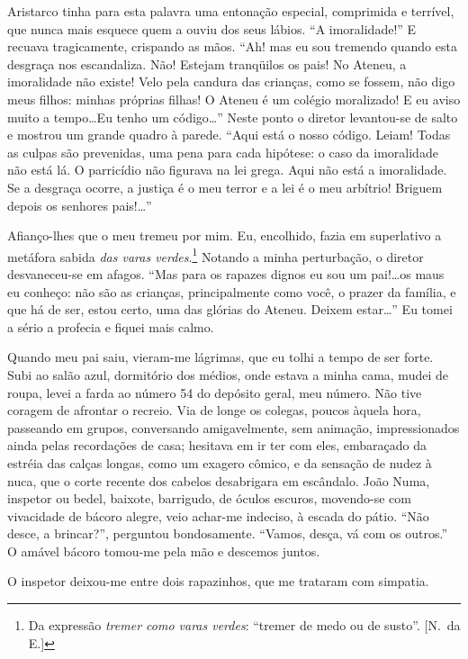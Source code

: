 Aristarco tinha para esta palavra uma
entonação especial, comprimida e terrível, que nunca mais esquece quem
a ouviu dos seus lábios. ``A imoralidade!'' E recuava tragicamente,
crispando as mãos. ``Ah! mas eu sou tremendo quando esta desgraça nos
escandaliza. Não! Estejam tranqüilos os pais! No Ateneu, a imoralidade
não existe! Velo pela candura das crianças, como se fossem, não digo
meus filhos: minhas próprias filhas! O Ateneu é um colégio moralizado!
E eu aviso muito a tempo\ldots Eu tenho um código\ldots'' Neste ponto o
diretor levantou{}-se de salto e mostrou um grande quadro à parede.
``Aqui está o nosso código. Leiam! Todas as culpas são prevenidas, uma
pena para cada hipótese: o caso da imoralidade não está lá. O
parricídio não figurava na lei grega. Aqui não está a imoralidade. Se a
desgraça ocorre, a justiça é o meu terror e a lei é o meu arbítrio!
Briguem depois os senhores pais!\ldots'' 

Afianço{}-lhes que o meu tremeu
por mim. Eu, encolhido, fazia em superlativo a metáfora sabida 
\textit{das varas verdes}.\footnote{ Da expressão \textit{tremer como varas verdes}: 
``tremer de medo ou de susto''. [N.~da E.]} Notando a minha perturbação, o diretor desvaneceu{}-se 
em afagos. ``Mas para os rapazes dignos eu sou um pai!\ldots os maus eu
conheço: não são as crianças, principalmente como você, o prazer da
família, e que há de ser, estou certo, uma das glórias do Ateneu.
Deixem estar\ldots'' Eu tomei a sério a profecia e fiquei mais calmo.

Quando meu pai saiu, vieram{}-me lágrimas, que eu tolhi a tempo de ser
forte. Subi ao salão azul, dormitório dos médios, onde estava a minha
cama, mudei de roupa, levei a farda ao número 54 do depósito geral, meu
número. Não tive coragem de afrontar o recreio. Via de longe os
colegas, poucos àquela hora, passeando em grupos, conversando
amigavelmente, sem animação, impressionados ainda pelas recordações de
casa; hesitava em ir ter com eles, embaraçado da estréia das calças
longas, como um exagero cômico, e da sensação de nudez à nuca, que o
corte recente dos cabelos desabrigara em escândalo. João Numa, inspetor
ou bedel, baixote, barrigudo, de óculos escuros, movendo{}-se com
vivacidade de bácoro alegre, veio achar{}-me indeciso, à escada do
pátio. ``Não desce, a brincar?'', perguntou bondosamente. ``Vamos, desça,
vá com os outros.'' O amável bácoro tomou{}-me pela mão e descemos juntos. 

O inspetor deixou{}-me entre dois rapazinhos, que me trataram
com simpatia. 

